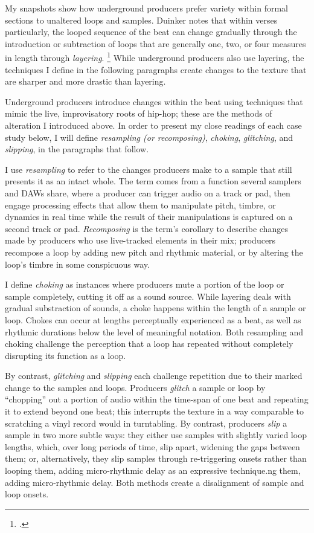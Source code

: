 My snapshots show how underground producers prefer variety within formal sections to unaltered
loops and samples. Duinker notes that within verses particularly, the looped sequence of the beat
can change gradually through the introduction or subtraction of loops that are generally one, two,
or four measures in length through \emph{layering}. \footnote{
    \cite[96]{benduinkerSongFormMainstreaming2020}.} 
While underground producers also use layering, the techniques I define in the following
paragraphs create changes to the texture that are sharper and more drastic than layering.

Underground producers introduce changes within the beat using techniques that mimic the 
live, improvisatory roots of hip-hop; these are the methods of alteration I introduced 
above.  In order to present my close readings of each case study below, I will define 
\emph{resampling (or recomposing)}, \emph{choking}, \emph{glitching}, and \emph{slipping}, 
in the paragraphs that follow.

I use \emph{resampling} to refer to the changes producers make to a sample that still presents it 
as an intact whole. The term comes from a function several samplers and DAWs share, where a producer
can trigger audio on a track or pad, then engage processing effects that allow them to manipulate 
pitch, timbre, or dynamics in real time while the result of their manipulations is captured on a
second track or pad. \textit{Recomposing} is the term's corollary to describe changes made by
producers who use live-tracked elements in their mix; producers recompose a loop by adding new
pitch and rhythmic material, or by altering the loop's timbre in some conspicuous way.

I define \emph{choking} as instances where producers mute a portion of the loop or sample
completely, cutting it off as a sound source. While layering deals with gradual substraction
of sounds, a choke happens within the length of a sample or loop. Chokes can occur at lengths
perceptually experienced as a beat, as well as rhythmic durations below the level of meaningful
notation. Both resampling and choking challenge the perception that a loop has repeated without
completely disrupting its function as a loop.

\label{glitch}
By contrast, \emph{glitching} and \emph{slipping} each challenge repetition due to their marked 
change to the samples and loops. Producers \emph{glitch} a sample or loop by ``chopping'' out
a portion of audio within the time-span of one beat and repeating it to extend beyond one beat; 
this interrupts the texture in a way comparable to scratching a vinyl record would in turntabling. 
By contrast, producers \emph{slip} a sample in two more subtle ways: they either use samples with
slightly varied loop lengths, which, over long periods of time, slip apart, widening the gaps
between them; or, alternatively, they slip samples through re-triggering onsets rather than
looping them, adding micro-rhythmic delay as an expressive technique.ng them, adding micro-rhythmic 
delay. Both methods create a disalignment of sample and loop onsets.


